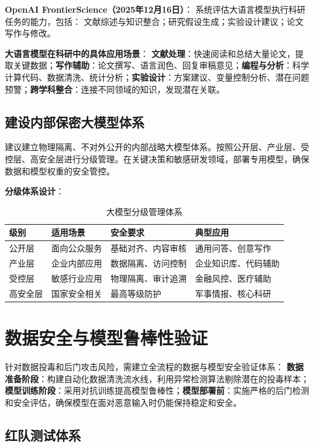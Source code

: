 \textbf{OpenAI FrontierScience（2025年12月16日）}：
系统评估大语言模型执行科研任务的能力，包括：
文献综述与知识整合；研究假设生成；实验设计建议；论文写作与修改。

\textbf{大语言模型在科研中的具体应用场景}：
\textbf{文献处理}：快速阅读和总结大量论文，提取关键数据；\textbf{写作辅助}：论文撰写、语言润色、回复审稿意见；\textbf{编程与分析}：科学计算代码、数据清洗、统计分析；\textbf{实验设计}：方案建议、变量控制分析、潜在问题预警；\textbf{跨学科整合}：连接不同领域的知识，发现潜在关联。

\subsection{建设内部保密大模型体系}

建议建立物理隔离、不对外公开的内部战略大模型体系。按照公开层、产业层、受控层、高安全层进行分级管理。在关键决策和敏感研发领域，部署专用模型，确保数据和模型权重的安全管控。

\textbf{分级体系设计}：

\begin{table}[H]
\centering
\caption{大模型分级管理体系}
\small
\begin{tabular}{p{2cm}p{3cm}p{4cm}p{3.5cm}}
\toprule
\textbf{级别} & \textbf{适用场景} & \textbf{安全要求} & \textbf{典型应用} \\
\midrule
公开层 & 面向公众服务 & 基础对齐、内容审核 & 通用问答、创意写作 \\
产业层 & 企业内部应用 & 数据隔离、访问控制 & 企业知识库、代码辅助 \\
受控层 & 敏感行业应用 & 物理隔离、审计追溯 & 金融风控、医疗辅助 \\
高安全层 & 国家安全相关 & 最高等级防护 & 军事情报、核心科研 \\
\bottomrule
\end{tabular}
\end{table}

\section{数据安全与模型鲁棒性验证}

针对数据投毒和后门攻击风险，需建立全流程的数据与模型安全验证体系：
\textbf{数据准备阶段}：构建自动化数据清洗流水线，利用异常检测算法剔除潜在的投毒样本；\textbf{模型训练阶段}：采用对抗训练提高模型鲁棒性；\textbf{模型部署前}：实施严格的后门检测和安全评估，确保模型在面对恶意输入时仍能保持稳定和安全。

\subsection{红队测试体系}

